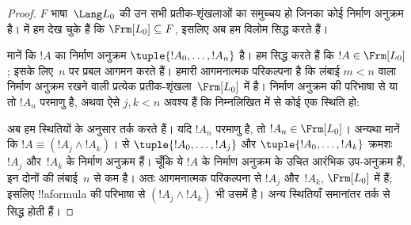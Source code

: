 \documentclass[../../../include/open-logic-section]{subfiles}
\begin{document}
\begin{proof}
$F$ भाषा~$\Lang L_0$ की उन सभी प्रतीक-शृंखलाओं का समुच्चय हो जिनका कोई
निर्माण अनुक्रम है।  में हम देख चुके हैं
कि $\Frm[L_0] \subseteq F$, इसलिए अब हम विलोम सिद्ध करते हैं।

मानें कि $!A$ का निर्माण अनुक्रम $\tuple{!A_0,\dotsc,!A_n}$ है। हम सिद्ध
करते हैं कि $!A \in \Frm[L_0]$; इसके लिए~$n$ पर प्रबल आगमन करते हैं। हमारी आगमनात्मक
परिकल्पना है कि लंबाई $m < n$ वाला निर्माण अनुक्रम रखने वाली प्रत्येक
प्रतीक-शृंखला~$\Frm[L_0]$ में है। निर्माण अनुक्रम की परिभाषा से या तो
$!A_n$ परमाणु है, अथवा ऐसे $j,k < n$ अवश्य हैं कि निम्नलिखित में से कोई
एक स्थिति हो:
\begin{enumerate}
\end{enumerate}
अब हम स्थितियों के अनुसार तर्क करते हैं। यदि $!A_n$ परमाणु है, तो
$!A_n \in \Frm[L_0]$। अन्यथा मानें कि $!A \equiv
(!A_j \land !A_k)$।  से
$\tuple{!A_0,\dotsc,!A_j}$ और $\tuple{!A_0,\dotsc,!A_k}$ क्रमशः $!A_j$
और~$!A_k$ के निर्माण अनुक्रम हैं। चूँकि ये $!A$ के निर्माण अनुक्रम के
उचित आरंभिक उप-अनुक्रम हैं, इन दोनों की लंबाई~$n$ से कम है। अतः आगमनात्मक
परिकल्पना से $!A_j$ और~$!A_k$, $\Frm[L_0]$ में हैं; इसलिए !!a{formula}
की परिभाषा से $(!A_j \land !A_k)$ भी उसमें है। अन्य स्थितियाँ समानांतर
तर्क से सिद्ध होती हैं।
\end{proof}
\end{document}

